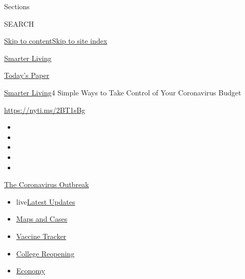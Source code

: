 Sections

SEARCH

\protect\hyperlink{site-content}{Skip to
content}\protect\hyperlink{site-index}{Skip to site index}

\href{https://www.nytimes.com/section/smarter-living}{Smarter Living}

\href{https://myaccount.nytimes.com/auth/login?response_type=cookie\&client_id=vi}{}

\href{https://www.nytimes.com/section/todayspaper}{Today's Paper}

\href{/section/smarter-living}{Smarter Living}\textbar{}4 Simple Ways to
Take Control of Your Coronavirus Budget

\url{https://nyti.ms/2BT1sBg}

\begin{itemize}
\item
\item
\item
\item
\item
\end{itemize}

\href{https://www.nytimes.com/news-event/coronavirus?action=click\&pgtype=Article\&state=default\&region=TOP_BANNER\&context=storylines_menu}{The
Coronavirus Outbreak}

\begin{itemize}
\tightlist
\item
  live\href{https://www.nytimes.com/2020/08/04/world/coronavirus-cases.html?action=click\&pgtype=Article\&state=default\&region=TOP_BANNER\&context=storylines_menu}{Latest
  Updates}
\item
  \href{https://www.nytimes.com/interactive/2020/us/coronavirus-us-cases.html?action=click\&pgtype=Article\&state=default\&region=TOP_BANNER\&context=storylines_menu}{Maps
  and Cases}
\item
  \href{https://www.nytimes.com/interactive/2020/science/coronavirus-vaccine-tracker.html?action=click\&pgtype=Article\&state=default\&region=TOP_BANNER\&context=storylines_menu}{Vaccine
  Tracker}
\item
  \href{https://www.nytimes.com/2020/08/02/us/covid-college-reopening.html?action=click\&pgtype=Article\&state=default\&region=TOP_BANNER\&context=storylines_menu}{College
  Reopening}
\item
  \href{https://www.nytimes.com/live/2020/08/04/business/stock-market-today-coronavirus?action=click\&pgtype=Article\&state=default\&region=TOP_BANNER\&context=storylines_menu}{Economy}
\end{itemize}

